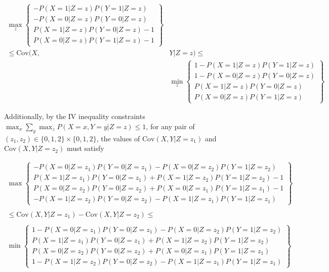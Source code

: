\documentclass[
]{article}
\theoremstyle{plain}
\begin{document}
\[
\begin{aligned}
  \max_z\left\{
      \begin{array}{c}
        -P(X = 1 | Z = z)P(Y = 1 | Z = z) \\
        -P(X = 0 | Z = z)P(Y = 0 | Z = z) \\
        P(X = 1 | Z = z)P(Y = 0 | Z = z) - 1\\
        P(X = 0 | Z = z)P(Y = 1 | Z = z) - 1
      \end{array}
    \right\} & \\
    \le \text{Cov}(X, &Y | Z = z) \le \\
    &\min_z\left\{
      \begin{array}{c}
        1 - P(X = 1 | Z = z)P(Y = 1 | Z = z) \\
        1 - P(X = 0 | Z = z)P(Y = 0 | Z = z) \\
        P(X = 1 | Z = z)P(Y = 0 | Z = z) \\
        P(X = 0 | Z = z)P(Y = 1 | Z = z)
      \end{array}
    \right\}
\end{aligned}
\]

Additionally, by the IV inequality constraints \(\max_x \sum_y \max_z P(X = x, Y = y | Z = z) \le 1\), for any pair of \((z_1, z_2) \in \{0,1,2\} \times \{0,1,2\}\), the values of \(\text{Cov}(X, Y | Z = z_1)\) and \(\text{Cov}(X, Y | Z = z_2)\) must satisfy

\[
\begin{aligned}
  \max\left\{
      \begin{array}{c}
        -P(X = 0 | Z = z_1)P(Y = 0 | Z = z_1) - P(X = 0 | Z = z_2)P(Y = 1 | Z = z_2) \\
        P(X = 1 | Z = z_1)P(Y = 0 | Z = z_1) + P(X = 1 | Z = z_2)P(Y = 1 | Z = z_2) -1 \\
        P(X = 0 | Z = z_2)P(Y = 0 | Z = z_2) + P(X = 0 | Z = z_1)P(Y = 1 | Z = z_1) - 1 \\
        -P(X = 1 | Z = z_2)P(Y = 0 | Z = z_2) - P(X = 1 | Z = z_1)P(Y = 1 | Z = z_1)
      \end{array}
    \right\} \qquad \qquad & \\ \\
    \le \text{Cov}(X,Y | Z = z_1) - \text{Cov}(X,Y | Z = z_2) \le \qquad \qquad \qquad \qquad  \qquad& \\ \\
    \min\left\{
      \begin{array}{c}
        1 -P(X = 0 | Z = z_1)P(Y = 0 | Z = z_1) - P(X = 0 | Z = z_2)P(Y = 1 | Z = z_2) \\
        P(X = 1 | Z = z_1)P(Y = 0 | Z = z_1) + P(X = 1 | Z = z_2)P(Y = 1 | Z = z_2) \\
        P(X = 0 | Z = z_2)P(Y = 0 | Z = z_2) + P(X = 0 | Z = z_1)P(Y = 1 | Z = z_1) \\
        1 - P(X = 1 | Z = z_2)P(Y = 0 | Z = z_2) - P(X = 1 | Z = z_1)P(Y = 1 | Z = z_1)
      \end{array}
    \right\} &
\end{aligned}
\]
\end{document}
